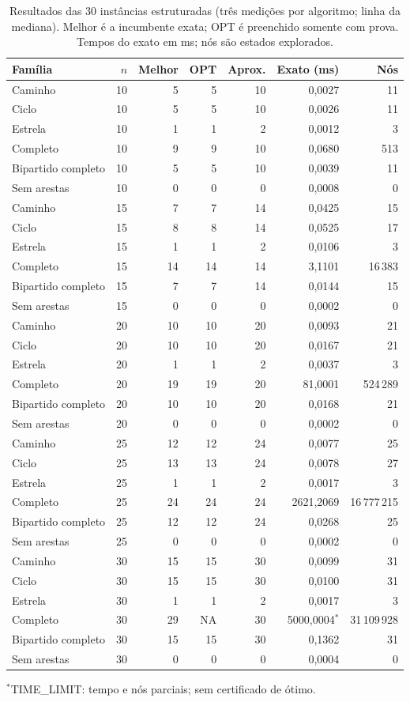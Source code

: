\begin{table}[htbp]
\centering
\caption{Resultados das 30 instâncias estruturadas (três medições por algoritmo; linha da mediana). Melhor é a incumbente exata; OPT é preenchido somente com prova. Tempos do exato em ms; nós são estados explorados.}
\label{tab:structured}
\small
\setlength{\tabcolsep}{4pt}
\begin{tabular}{lrrrrrr}
\toprule
Família & $n$ & Melhor & OPT & Aprox. & Exato (ms) & Nós \\
\midrule
Caminho & 10 & 5 & 5 & 10 & 0,0027 & 11 \\
Ciclo & 10 & 5 & 5 & 10 & 0,0026 & 11 \\
Estrela & 10 & 1 & 1 & 2 & 0,0012 & 3 \\
Completo & 10 & 9 & 9 & 10 & 0,0680 & 513 \\
Bipartido completo & 10 & 5 & 5 & 10 & 0,0039 & 11 \\
Sem arestas & 10 & 0 & 0 & 0 & 0,0008 & 0 \\
Caminho & 15 & 7 & 7 & 14 & 0,0425 & 15 \\
Ciclo & 15 & 8 & 8 & 14 & 0,0525 & 17 \\
Estrela & 15 & 1 & 1 & 2 & 0,0106 & 3 \\
Completo & 15 & 14 & 14 & 14 & 3,1101 & 16\,383 \\
Bipartido completo & 15 & 7 & 7 & 14 & 0,0144 & 15 \\
Sem arestas & 15 & 0 & 0 & 0 & 0,0002 & 0 \\
Caminho & 20 & 10 & 10 & 20 & 0,0093 & 21 \\
Ciclo & 20 & 10 & 10 & 20 & 0,0167 & 21 \\
Estrela & 20 & 1 & 1 & 2 & 0,0037 & 3 \\
Completo & 20 & 19 & 19 & 20 & 81,0001 & 524\,289 \\
Bipartido completo & 20 & 10 & 10 & 20 & 0,0168 & 21 \\
Sem arestas & 20 & 0 & 0 & 0 & 0,0002 & 0 \\
Caminho & 25 & 12 & 12 & 24 & 0,0077 & 25 \\
Ciclo & 25 & 13 & 13 & 24 & 0,0078 & 27 \\
Estrela & 25 & 1 & 1 & 2 & 0,0017 & 3 \\
Completo & 25 & 24 & 24 & 24 & 2621,2069 & 16\,777\,215 \\
Bipartido completo & 25 & 12 & 12 & 24 & 0,0268 & 25 \\
Sem arestas & 25 & 0 & 0 & 0 & 0,0002 & 0 \\
Caminho & 30 & 15 & 15 & 30 & 0,0099 & 31 \\
Ciclo & 30 & 15 & 15 & 30 & 0,0100 & 31 \\
Estrela & 30 & 1 & 1 & 2 & 0,0017 & 3 \\
Completo & 30 & 29 & NA & 30 & 5000,0004$^{*}$ & 31\,109\,928 \\
Bipartido completo & 30 & 15 & 15 & 30 & 0,1362 & 31 \\
Sem arestas & 30 & 0 & 0 & 0 & 0,0004 & 0 \\
\bottomrule
\end{tabular}

\smallskip
{\footnotesize $^{*}$TIME\_LIMIT: tempo e nós parciais; sem certificado de ótimo.}
\end{table}

